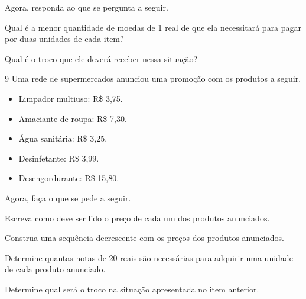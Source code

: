 Agora, responda ao que se pergunta a seguir.

\begin{escolha}
\item
  Qual é a menor quantidade de moedas de 1 real de que ela necessitará para
  pagar por duas unidades de cada item?


\item
  Qual é o troco que ele deverá receber nessa situação?

\end{escolha}

\num{9} Uma rede de supermercados anunciou uma promoção com os produtos a seguir.

\begin{mdframed}[linewidth=2pt,linecolor=azul!20,backgroundcolor=azul!20,roundcorner=2pt]
\begin{itemize}
  \item Limpador multiuso: R\$ 3,75.
  \item Amaciante de roupa: R\$ 7,30.
  \item Água sanitária: R\$ 3,25.
  \item Desinfetante: R\$ 3,99.
  \item Desengordurante: R\$ 15,80.
\end{itemize}
\end{mdframed}

\pagebreak
Agora, faça o que se pede a seguir.

\begin{escolha}
\item
  Escreva como deve ser lido o preço de cada um dos produtos anunciados.






\item
  Construa uma sequência decrescente com os preços dos produtos anunciados.


\item
  Determine quantas notas de 20 reais são necessárias para adquirir uma unidade de cada produto anunciado.


\item
  Determine qual será o troco na situação apresentada no item anterior.

\end{escolha}

